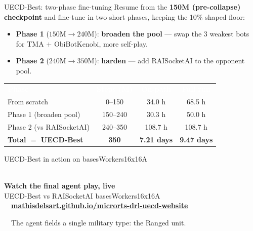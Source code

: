 \documentclass[aspectratio=169,11pt]{beamer}
\begin{document}
\begin{frame}{UECD-Best: two-phase fine-tuning}
  \small
  Resume from the \textbf{150M (pre-collapse) checkpoint} and fine-tune in two
  short phases, keeping the 10\% shaped floor:
  \begin{itemize}\setlength\itemsep{2pt}
    \item \textbf{\color{uclBlue}Phase 1} ($150\text{M}\to240\text{M}$): \textbf{broaden the pool}
          --- swap the 3 weakest bots for TMA $+$ ObiBotKenobi, more self-play.
    \item \textbf{\color{uclBlue}Phase 2} ($240\text{M}\to350\text{M}$): \textbf{harden}
          --- add RAISocketAI to the opponent pool.
  \end{itemize}
  \vspace{0.25cm}
  \centering
  {\footnotesize\renewcommand{\arraystretch}{1.12}%
  \begin{tabular}{l c c c}
    \rowcolor{uclBlue}
    \textcolor{white}{\textbf{Phase}} & \textcolor{white}{\textbf{Steps (M)}} &
    \textcolor{white}{\textbf{On-path}} & \textcolor{white}{\textbf{Full run}} \\
    From scratch              & 0--150   & 34.0 h  & 68.5 h \\
    Phase 1 (broaden pool)    & 150--240 & 30.3 h  & 50.0 h \\
    Phase 2 (vs RAISocketAI)  & 240--350 & 108.7 h & 108.7 h \\
    \rowcolor{uclAccent!18}
    \textbf{Total $=$ UECD-Best} & \textbf{350} & \textbf{7.21 days} & \textbf{9.47 days} \\
    \bottomrule
  \end{tabular}}
\end{frame}

\begin{frame}{UECD-Best in action on basesWorkers16x16A}
  \vfill
  \centering
  \begin{tcolorbox}[enhanced,colback=uclBlue!5,colframe=uclBlue!30,arc=6pt,boxrule=0.8pt,
      width=0.88\linewidth,left=16pt,right=16pt,top=15pt,bottom=15pt,
      drop fuzzy shadow=black!15]
    \centering
    {\fontsize{38}{38}\selectfont\color{uclBlue}\faLaptopCode}\\[0.6em]
    {\Large\bfseries\color{uclBlue}Watch the final agent play, live}\\[0.55em]
    {\footnotesize\color{black!60}UECD-Best \textcolor{black!45}{vs} RAISocketAI
      \;{\textcolor{uclBlue}{\textbullet}}\; basesWorkers16x16A}\\[0.7em]
    {\small\faGlobe~~\href{https://mathisdelsart.github.io/microrts-drl-uecd-website/}%
      {\color{uclBlue}\bfseries mathisdelsart.github.io/microrts-drl-uecd-website}}
  \end{tcolorbox}
  \vspace{0.5em}

  {\small {\color{uclAccent}\faCrosshairs}~~The agent fields a single military type:
  the \alert{Ranged} unit.}
  \vfill
\end{frame}
\end{document}
